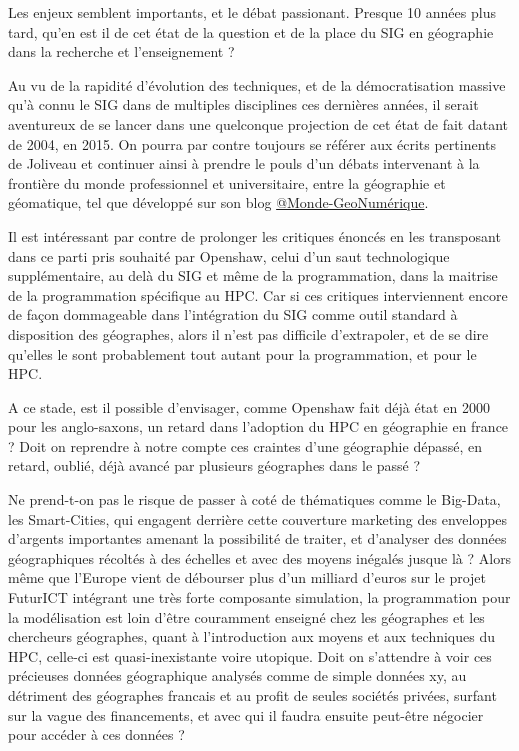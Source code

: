 
Les enjeux semblent importants, et le débat passionant. Presque 10 années plus tard, qu'en est il de cet état de la question et de la place du SIG en géographie dans la recherche et l'enseignement ? 

Au vu de la rapidité d'évolution des techniques, et de la démocratisation massive qu'à connu le SIG dans de multiples disciplines ces dernières années, il serait aventureux de se lancer dans une quelconque projection de cet état de fait datant de 2004, en 2015. On pourra par contre toujours se référer aux écrits pertinents de Joliveau et continuer ainsi à prendre le pouls d'un débats intervenant à la frontière du monde professionnel et universitaire, entre la géographie et géomatique, tel que développé sur son blog \href{https://mondegeonumerique.wordpress.com/}{@Monde-GeoNumérique}.

Il est intéressant par contre de prolonger les critiques énoncés en les transposant dans ce parti pris souhaité par Openshaw, celui d'un saut technologique supplémentaire, au delà du SIG et même de la programmation, dans la maitrise de la programmation spécifique au HPC. Car si ces critiques interviennent encore de façon dommageable dans l'intégration du SIG comme outil standard à disposition des géographes, alors il n'est pas difficile d'extrapoler, et de se dire qu'elles le sont probablement tout autant pour la programmation, et pour le HPC.

A ce stade, est il possible d'envisager, comme Openshaw fait déjà état en 2000 pour les anglo-saxons, un retard dans l'adoption du HPC en géographie en france ? Doit on reprendre à notre compte ces craintes d'une géographie dépassé, en retard, oublié, déjà avancé par plusieurs géographes dans le passé  ? 

Ne prend-t-on pas le risque de passer à coté de thématiques comme le Big-Data, les Smart-Cities, qui engagent derrière cette couverture marketing des enveloppes d'argents importantes amenant la possibilité de traiter, et d’analyser des données géographiques récoltés à des échelles et avec des moyens inégalés jusque là ? Alors même que l’Europe vient de débourser plus d'un milliard d’euros sur le projet FuturICT intégrant une très forte composante simulation, la programmation pour la modélisation est loin d’être couramment enseigné chez les géographes et les chercheurs géographes, quant à l'introduction aux moyens et aux techniques du HPC, celle-ci est quasi-inexistante voire utopique. Doit on s’attendre à voir ces précieuses données géographique analysés comme de simple données xy, au détriment des géographes francais et au profit de seules sociétés privées, surfant sur la vague des financements, et avec qui il faudra ensuite peut-être négocier pour accéder à ces données ?

